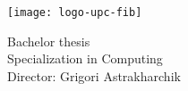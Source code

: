 
\thispagestyle{empty}
\clearpage
\setcounter{page}{-1}

\makeatletter
\begin{titlepage}
{
    \centering
    \texttt{[image: logo-upc-fib]}
    \null
    \vspace{3em}
    {\Huge \bfseries \@title \par}
    \vspace{2em}
    \vspace{3em}
    {\large \scshape \@date \par}

    \vfill
    {\raggedleft \large \bfseries \@author \par}
    \vspace{1em}
    {\raggedleft \large
        Bachelor thesis \\
        Specialization in Computing \\
        \vspace{2em}
        Director: Grigori Astrakharchik \\
    \par}
}
\end{titlepage}
\makeatother
